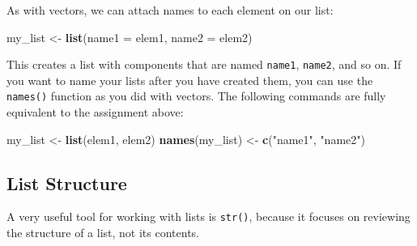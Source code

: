 \documentclass[
]{book}
\newenvironment{Shaded}{\begin{snugshade}}{\end{snugshade}}
\newcommand{\CommentTok}[1]{\textcolor[rgb]{0.56,0.35,0.01}{\textit{#1}}}
\newcommand{\DataTypeTok}[1]{\textcolor[rgb]{0.13,0.29,0.53}{#1}}
\newcommand{\DecValTok}[1]{\textcolor[rgb]{0.00,0.00,0.81}{#1}}
\newcommand{\KeywordTok}[1]{\textcolor[rgb]{0.13,0.29,0.53}{\textbf{#1}}}
\newcommand{\NormalTok}[1]{#1}
\newcommand{\OperatorTok}[1]{\textcolor[rgb]{0.81,0.36,0.00}{\textbf{#1}}}
\newcommand{\StringTok}[1]{\textcolor[rgb]{0.31,0.60,0.02}{#1}}
\begin{document}
As with vectors, we can attach names to each element on our list:

\begin{Shaded}
\begin{Highlighting}[]
\NormalTok{my_list <-}\StringTok{ }\KeywordTok{list}\NormalTok{(}\DataTypeTok{name1 =}\NormalTok{ elem1, }
                \DataTypeTok{name2 =}\NormalTok{ elem2)}
\end{Highlighting}
\end{Shaded}

This creates a list with components that are named \texttt{name1}, \texttt{name2}, and so on. If you want to name your lists after you have created them, you can use the \texttt{names()} function as you did with vectors. The following commands are fully equivalent to the assignment above:

\begin{Shaded}
\begin{Highlighting}[]
\NormalTok{my_list <-}\StringTok{ }\KeywordTok{list}\NormalTok{(elem1, elem2)}
\KeywordTok{names}\NormalTok{(my_list) <-}\StringTok{ }\KeywordTok{c}\NormalTok{(}\StringTok{"name1"}\NormalTok{, }\StringTok{"name2"}\NormalTok{)}
\end{Highlighting}
\end{Shaded}

\hypertarget{list-structure}{%
\subsection{List Structure}\label{list-structure}}

A very useful tool for working with lists is \texttt{str()}, because it focuses on reviewing the structure of a list, not its contents.

\begin{Shaded}
\end{Shaded}
\end{document}
